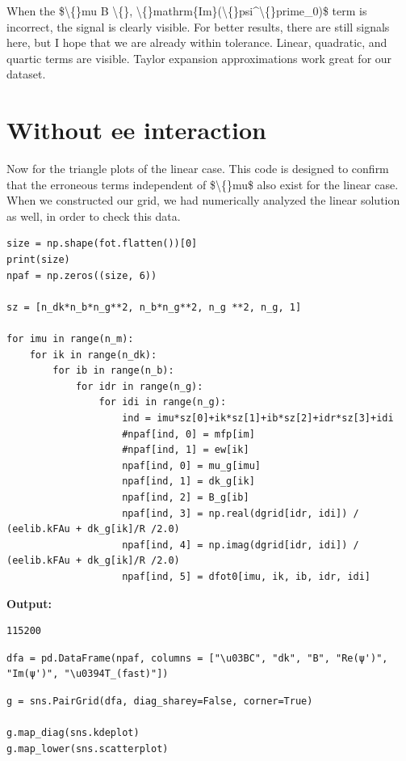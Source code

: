 \documentclass{article}
\begin{document}
When the \$\textbackslash\{\}mu B \textbackslash\{\}, \textbackslash\{\}mathrm\{Im\}(\textbackslash\{\}psi\textasciicircum{}\textbackslash\{\}prime\_0)\$ term is incorrect, the signal is clearly visible. For better results, there are still signals here, but I hope that we are already within tolerance. Linear, quadratic, and quartic terms are visible. Taylor expansion approximations work great for our dataset. 

\section{Without ee interaction}

Now for the triangle plots of the linear case. This code is designed to confirm that the erroneous terms independent of \$\textbackslash\{\}mu\$ also exist for the linear case. When we constructed our grid, we had numerically analyzed the linear solution as well, in order to check this data.

\begin{lstlisting}
size = np.shape(fot.flatten())[0]
print(size)
npaf = np.zeros((size, 6))

sz = [n_dk*n_b*n_g**2, n_b*n_g**2, n_g **2, n_g, 1]

for imu in range(n_m):
    for ik in range(n_dk):
        for ib in range(n_b):
            for idr in range(n_g):
                for idi in range(n_g):
                    ind = imu*sz[0]+ik*sz[1]+ib*sz[2]+idr*sz[3]+idi
                    #npaf[ind, 0] = mfp[im]
                    #npaf[ind, 1] = ew[ik]
                    npaf[ind, 0] = mu_g[imu]
                    npaf[ind, 1] = dk_g[ik]
                    npaf[ind, 2] = B_g[ib]
                    npaf[ind, 3] = np.real(dgrid[idr, idi]) / (eelib.kFAu + dk_g[ik]/R /2.0)
                    npaf[ind, 4] = np.imag(dgrid[idr, idi]) / (eelib.kFAu + dk_g[ik]/R /2.0)
                    npaf[ind, 5] = dfot0[imu, ik, ib, idr, idi]\end{lstlisting}

\textbf{Output:}\begin{verbatim}
115200

\end{verbatim}

\begin{lstlisting}
dfa = pd.DataFrame(npaf, columns = ["\u03BC", "dk", "B", "Re(ψ')", "Im(ψ')", "\u0394T_(fast)"])\end{lstlisting}

\begin{lstlisting}
g = sns.PairGrid(dfa, diag_sharey=False, corner=True)

g.map_diag(sns.kdeplot)
g.map_lower(sns.scatterplot)\end{lstlisting}
\end{document}
